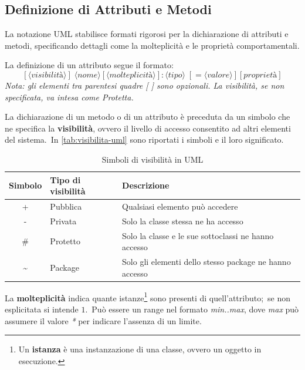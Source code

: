 \subsection{Definizione di Attributi e Metodi}

La notazione UML stabilisce formati rigorosi per la dichiarazione di attributi e metodi, specificando dettagli come la molteplicità e le proprietà comportamentali.

La definizione di un attributo segue il formato:
\[
    [\langle \textit{visibilità} \rangle] \;
    \langle \textit{nome} \rangle [\langle \textit{molteplicità} \rangle]: \langle \textit{tipo} \rangle \;
    [= \langle \textit{valore} \rangle][{\textit{proprietà}}]
\]
\textit{Nota: gli elementi tra parentesi quadre [ ] sono opzionali. La visibilità, se non specificata, va intesa come Protetta.}

La dichiarazione di un metodo o di un attributo è preceduta da un simbolo che ne specifica la \textbf{visibilità}, ovvero il livello di accesso consentito ad altri elementi del sistema.\
In \autoref{tab:visibilita-uml} sono riportati i simboli e il loro significato.

\begin{table}[h!]
    \centering
    \caption{Simboli di visibilità in UML}
    \label{tab:visibilita-uml}
    \begin{tabular}{c l p{8cm}}
        \toprule
        \textbf{Simbolo} & \textbf{Tipo di visibilità} & \textbf{Descrizione}                                    \\
        \midrule
        +                & Pubblica                    & Qualsiasi elemento può accedere                         \\
        -                & Privata                     & Solo la classe stessa ne ha accesso                     \\
        \#               & Protetto                    & Solo la classe e le sue sottoclassi ne hanno accesso    \\
        \textasciitilde  & Package                     & Solo gli elementi dello stesso package ne hanno accesso \\
        \bottomrule
    \end{tabular}
\end{table}

La \textbf{molteplicità} indica quante istanze\footnote{Un \textbf{istanza} è una instanzazione di una classe, ovvero un oggetto in esecuzione.} sono presenti di quell'attributo;\
se non esplicitata si intende $1$.\
Può essere un range nel formato \textit{min..max}, dove \textit{max} può assumere il valore \textit{*} per indicare l'assenza di un limite.

